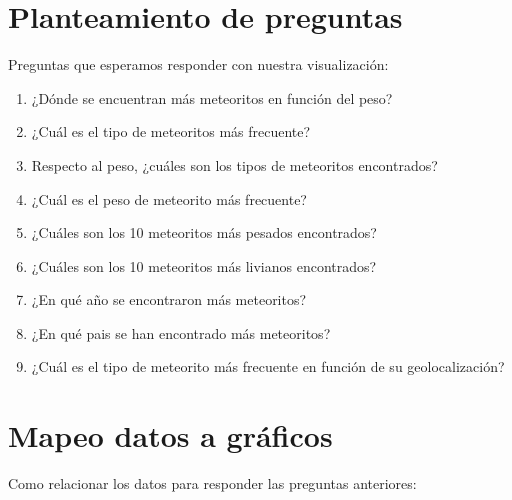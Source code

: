 \documentclass[letterpaper,10pt]{article}
\begin{document}
	\newpage

	\section{Planteamiento de preguntas}

	Preguntas que esperamos responder con nuestra visualización:


	\begin{enumerate}
		\item ¿Dónde se encuentran más meteoritos en función del peso?
		\item ¿Cuál es el tipo de meteoritos más frecuente? %
		\item Respecto al peso, ¿cuáles son los tipos de meteoritos encontrados? %

		\item ¿Cuál es el peso de meteorito más frecuente?
		\item ¿Cuáles son los 10 meteoritos más pesados encontrados?
		\item ¿Cuáles son los 10 meteoritos más livianos encontrados?

		\item ¿En qué año se encontraron más meteoritos?
		\item ¿En qué pais se han encontrado más meteoritos?
		\item ¿Cuál es el tipo de meteorito más frecuente en función de su geolocalización?
	\end{enumerate}

	\section{Mapeo datos a gráficos}

	Como relacionar los datos para responder las preguntas anteriores:
\end{document}
